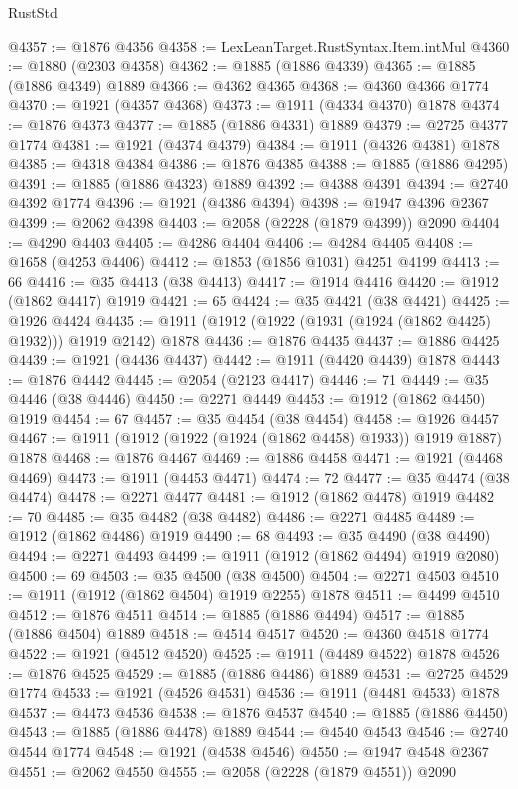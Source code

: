 \begin{lexlean}{RustStd}
\begin{coremodule}
@4357 := @1876 @4356
@4358 := LexLeanTarget.RustSyntax.Item.intMul
@4360 := @1880 (@2303 @4358)
@4362 := @1885 (@1886 @4339)
@4365 := @1885 (@1886 @4349) @1889
@4366 := @4362 @4365
@4368 := @4360 @4366 @1774
@4370 := @1921 (@4357 @4368)
@4373 := @1911 (@4334 @4370) @1878
@4374 := @1876 @4373
@4377 := @1885 (@1886 @4331) @1889
@4379 := @2725 @4377 @1774
@4381 := @1921 (@4374 @4379)
@4384 := @1911 (@4326 @4381) @1878
@4385 := @4318 @4384
@4386 := @1876 @4385
@4388 := @1885 (@1886 @4295)
@4391 := @1885 (@1886 @4323) @1889
@4392 := @4388 @4391
@4394 := @2740 @4392 @1774
@4396 := @1921 (@4386 @4394)
@4398 := @1947 @4396 @2367
@4399 := @2062 @4398
@4403 := @2058 (@2228 (@1879 @4399)) @2090
@4404 := @4290 @4403
@4405 := @4286 @4404
@4406 := @4284 @4405
@4408 := @1658 (@4253 @4406)
@4412 := @1853 (@1856 @1031) @4251 @4199
@4413 := 66
@4416 := @35 @4413 (@38 @4413)
@4417 := @1914 @4416
@4420 := @1912 (@1862 @4417) @1919
@4421 := 65
@4424 := @35 @4421 (@38 @4421)
@4425 := @1926 @4424
@4435 := @1911 (@1912 (@1922 (@1931 (@1924 (@1862 @4425) @1932))) @1919 @2142) @1878
@4436 := @1876 @4435
@4437 := @1886 @4425
@4439 := @1921 (@4436 @4437)
@4442 := @1911 (@4420 @4439) @1878
@4443 := @1876 @4442
@4445 := @2054 (@2123 @4417)
@4446 := 71
@4449 := @35 @4446 (@38 @4446)
@4450 := @2271 @4449
@4453 := @1912 (@1862 @4450) @1919
@4454 := 67
@4457 := @35 @4454 (@38 @4454)
@4458 := @1926 @4457
@4467 := @1911 (@1912 (@1922 (@1924 (@1862 @4458) @1933)) @1919 @1887) @1878
@4468 := @1876 @4467
@4469 := @1886 @4458
@4471 := @1921 (@4468 @4469)
@4473 := @1911 (@4453 @4471)
@4474 := 72
@4477 := @35 @4474 (@38 @4474)
@4478 := @2271 @4477
@4481 := @1912 (@1862 @4478) @1919
@4482 := 70
@4485 := @35 @4482 (@38 @4482)
@4486 := @2271 @4485
@4489 := @1912 (@1862 @4486) @1919
@4490 := 68
@4493 := @35 @4490 (@38 @4490)
@4494 := @2271 @4493
@4499 := @1911 (@1912 (@1862 @4494) @1919 @2080)
@4500 := 69
@4503 := @35 @4500 (@38 @4500)
@4504 := @2271 @4503
@4510 := @1911 (@1912 (@1862 @4504) @1919 @2255) @1878
@4511 := @4499 @4510
@4512 := @1876 @4511
@4514 := @1885 (@1886 @4494)
@4517 := @1885 (@1886 @4504) @1889
@4518 := @4514 @4517
@4520 := @4360 @4518 @1774
@4522 := @1921 (@4512 @4520)
@4525 := @1911 (@4489 @4522) @1878
@4526 := @1876 @4525
@4529 := @1885 (@1886 @4486) @1889
@4531 := @2725 @4529 @1774
@4533 := @1921 (@4526 @4531)
@4536 := @1911 (@4481 @4533) @1878
@4537 := @4473 @4536
@4538 := @1876 @4537
@4540 := @1885 (@1886 @4450)
@4543 := @1885 (@1886 @4478) @1889
@4544 := @4540 @4543
@4546 := @2740 @4544 @1774
@4548 := @1921 (@4538 @4546)
@4550 := @1947 @4548 @2367
@4551 := @2062 @4550
@4555 := @2058 (@2228 (@1879 @4551)) @2090

\end{coremodule}
\end{lexlean}
